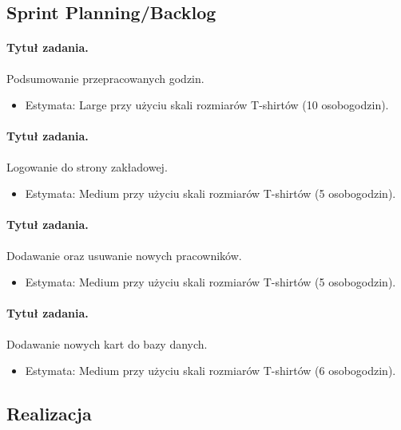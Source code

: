 \documentclass[a4paper]{article}
\begin{document}
\subsection{Sprint Planning/Backlog}

\paragraph{Tytuł zadania.} Podsumowanie przepracowanych godzin.
\begin{itemize}
\item Estymata: Large przy użyciu skali rozmiarów T-shirtów (10 osobogodzin).
\end{itemize}

\paragraph{Tytuł zadania.} Logowanie do strony zakładowej.
\begin{itemize}
\item Estymata: Medium przy użyciu skali rozmiarów T-shirtów (5 osobogodzin).
\end{itemize}

\paragraph{Tytuł zadania.} Dodawanie oraz usuwanie nowych pracowników.
\begin{itemize}
\item Estymata: Medium przy użyciu skali rozmiarów T-shirtów (5 osobogodzin).
\end{itemize}

\paragraph{Tytuł zadania.} Dodawanie nowych kart do bazy danych.
\begin{itemize}
\item Estymata: Medium przy użyciu skali rozmiarów T-shirtów (6 osobogodzin).
\end{itemize}



\subsection{Realizacja}
\end{document}
